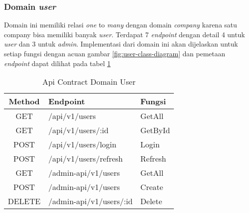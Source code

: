 \subsubsection{Domain \textit{user}}

Domain ini memiliki relasi \textit{one} to \textit{many} dengan domain \textit{company} karena satu company bisa memiliki banyak \textit{user}. Terdapat 7 \textit{endpoint} dengan detail 4 untuk \textit{user} dan 3 untuk \textit{admin}. Implementasi dari domain ini akan dijelaskan untuk setiap fungsi dengan acuan gambar \ref{fig:user-class-diagram} dan pemetaan \textit{endpoint} dapat dilihat pada tabel \ref{tab:api-contract-domain-user}

\bgroup
\begin{table}[ht]
  \caption{Api Contract Domain User}
  \label{tab:api-contract-domain-user}
  \def\arraystretch{1.7}
  \centering
  \begin{tabular}{|c|p{6cm}|p{4cm}|}
    \hline
    Method & Endpoint                &
    Fungsi                                     \\
    \hline
    GET    & /api/v1/users           & GetAll  \\
    \hline
    GET    & /api/v1/users/:id       & GetById \\
    \hline
    POST   & /api/v1/users/login     & Login   \\
    \hline
    POST   & /api/v1/users/refresh   & Refresh \\
    \hline
    GET    & /admin-api/v1/users     & GetAll  \\
    \hline
    POST   & /admin-api/v1/users     & Create  \\
    \hline
    DELETE & /admin-api/v1/users/:id & Delete  \\
    \hline
  \end{tabular}
\end{table}
\egroup

\pagebreak


